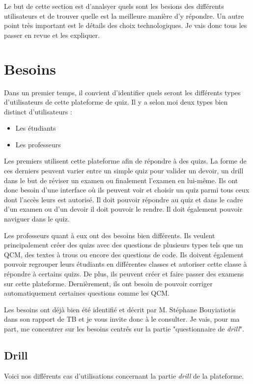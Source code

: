 Le but de cette section est d'analsyer quels sont les besions des différents utilisateurs et de trouver quelle est la meilleure manière d'y répondre. Un autre point très important est le détails des choix technologiques. Je vais donc tous les passer en revue et les expliquer.
\section{Besoins}

Dans un premier temps, il convient d'identifier quels seront les différents types d'utilisateurs de cette plateforme de quiz. Il y a selon moi deux types bien distinct d'utilisateurs :
\begin{itemize}
    \item Les étudiants
    \item Les professeurs
\end{itemize}

Les premiers utilisent cette plateforme afin de répondre à des quizs. La forme de ces derniers peuvent varier entre un simple quiz pour valider un devoir, un drill dans le but de réviser un examen ou finalement l'examen en lui-même. Ils ont donc besoin d'une interface où ils peuvent voir et choisir un quiz parmi tous ceux dont l'accès leurs est autorisé. Il doit pouvoir répondre au quiz et dans le cadre d'un examen ou d'un devoir il doit pouvoir le rendre. Il doit également pouvoir naviguer dans le quiz.

Les professeurs quant à eux ont des besoins bien différents. Ils veulent principalement créer des quizs avec des questions de plusieurs types tels que un QCM, des textes à trous ou encore des questions de code. Ils doivent également pouvoir regrouper leurs étudiants en différentes classes et autoriser cette classe à répondre à certains quizs. De plus, ils peuvent créer et faire passer des examens sur cette plateforme. Dernièrement, ils ont besoin de pouvoir corriger automatiquement certaines questions comme les QCM.

Les besoins ont déjà bien été identifié et décrit par M. Stéphane Bouyiatiotis dans son rapport de TB et je vous invite donc à le consulter. Je vais, pour ma part, me concentrer sur les besoins centrés sur la partie "questionnaire de \emph{drill}".

\subsection{Drill}

Voici nos différents cas d'utilisations concernant la partie \emph{drill} de la plateforme.

